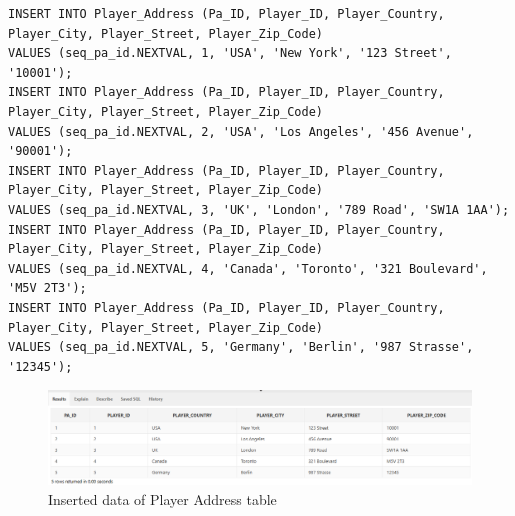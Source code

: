\begin{lstlisting}[caption={Inserting data into Player\_Address tables},label={lst:insert_Player_Address}]
INSERT INTO Player_Address (Pa_ID, Player_ID, Player_Country, Player_City, Player_Street, Player_Zip_Code)
VALUES (seq_pa_id.NEXTVAL, 1, 'USA', 'New York', '123 Street', '10001');
INSERT INTO Player_Address (Pa_ID, Player_ID, Player_Country, Player_City, Player_Street, Player_Zip_Code)
VALUES (seq_pa_id.NEXTVAL, 2, 'USA', 'Los Angeles', '456 Avenue', '90001');
INSERT INTO Player_Address (Pa_ID, Player_ID, Player_Country, Player_City, Player_Street, Player_Zip_Code)
VALUES (seq_pa_id.NEXTVAL, 3, 'UK', 'London', '789 Road', 'SW1A 1AA');
INSERT INTO Player_Address (Pa_ID, Player_ID, Player_Country, Player_City, Player_Street, Player_Zip_Code)
VALUES (seq_pa_id.NEXTVAL, 4, 'Canada', 'Toronto', '321 Boulevard', 'M5V 2T3');
INSERT INTO Player_Address (Pa_ID, Player_ID, Player_Country, Player_City, Player_Street, Player_Zip_Code)
VALUES (seq_pa_id.NEXTVAL, 5, 'Germany', 'Berlin', '987 Strasse', '12345');
\end{lstlisting}

\begin{figure}[H]
    \centering
    \includegraphics[width=1\textwidth]{images/TableData/PLAYER_ADDRESS.png}
    \caption{Inserted data of Player Address table}
\end{figure}

